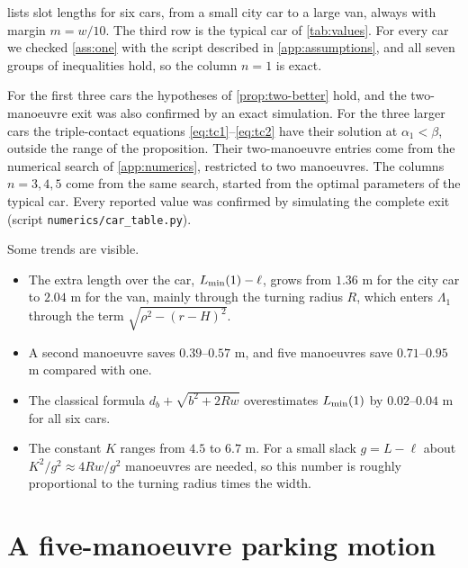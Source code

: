  lists slot lengths for six cars, from a small city car to a large van, always with margin $m=w/10$.
The third row is the typical car of \cref{tab:values}.
For every car we checked \cref{ass:one} with the script described in \cref{app:assumptions}, and all seven groups of inequalities hold, so the column $n=1$ is exact.

For the first three cars the hypotheses of \cref{prop:two-better} hold, and the two-manoeuvre exit was also confirmed by an exact simulation.
For the three larger cars the triple-contact equations \eqref{eq:tc1}--\eqref{eq:tc2} have their solution at $\alpha_1<\beta$, outside the range of the proposition.
Their two-manoeuvre entries come from the numerical search of \cref{app:numerics}, restricted to two manoeuvres.
The columns $n=3,4,5$ come from the same search, started from the optimal parameters of the typical car.
Every reported value was confirmed by simulating the complete exit (script \texttt{numerics/car\_table.py}).



Some trends are visible.
\begin{itemize}[nosep]
\item The extra length over the car, $L_{\min}(1)-\ell$, grows from $1.36$ m for the city car to $2.04$ m for the van, mainly through the turning radius $R$, which enters $\Lambda_1$ through the term $\sqrt{\rho^2-(r-H)^2}$.
\item A second manoeuvre saves $0.39$--$0.57$ m, and five manoeuvres save $0.71$--$0.95$ m compared with one.
\item The classical formula $d_b+\sqrt{b^2+2Rw}$ overestimates $L_{\min}(1)$ by $0.02$--$0.04$ m for all six cars.
\item The constant $K$ ranges from $4.5$ to $6.7$ m. For a small slack $g=L-\ell$ about $K^2/g^2\approx4Rw/g^2$ manoeuvres are needed, so this number is roughly proportional to the turning radius times the width.
\end{itemize}

\section{A five-manoeuvre parking motion}\label{app:five}

